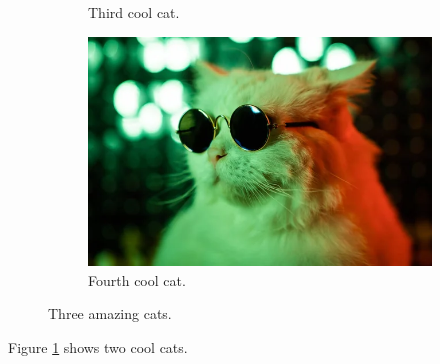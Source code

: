 \documentclass{article}
\begin{document}
\begin{figure}[h!]
\begin{subfigure}[b]{0.3\linewidth}
	\caption{Third cool cat.}
\end{subfigure}
\begin{subfigure}[b]{0.5\linewidth}
	\includegraphics[width=\linewidth]{fourth_cool_cat.jpg}
	\caption{Fourth cool cat.}
\end{subfigure}
\caption{Three amazing cats.}
\label{fig:four_cats}
\end{figure}

Figure \ref{fig:four_cats} shows two cool cats.
\end{document}
